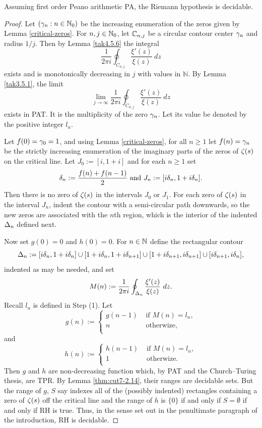 \documentclass[12pt]{article}
\begin{document}
\begin{theorem}\label{thm:RHdec}
Assuming first order Peano arithmetic PA, the Riemann hypothesis is decidable.
\end{theorem}
\begin{proof}

 Let $(\gamma_n:n\in\mathbb{N}_0)$ be the increasing enumeration of the zeros given by Lemma \ref{critical-zeros}. For $n,j\in\mathbb{N}_0$, let $\mathbb{C}_{n,j}$ be a circular contour center $\gamma_n$ and radius $1/j$. Then by Lemma \ref{tak4.5.6} the integral
$$
\frac{1}{2\pi i}\oint_{C_{n,j}} \frac{\xi'(z)}{\xi(z)}~dz
$$
exists and is monotonically decreasing in $j$ with values in $\mathbb{N}$. By Lemma \ref{tak3.5.1}, the limit
$$
\lim_{j\rightarrow \infty} \frac{1}{2\pi i}\oint_{C_{n,j}} \frac{\xi'(z)}{\xi(z)}~dz
$$
exists in PAT. It is the multiplicity of the zero $\gamma_n$. Let its value be denoted by the positive integer $l_n$.
\bigskip


 Let $f(0)=\gamma_0=1$, and using Lemma \ref{critical-zeros}, for all $n\ge 1$ let $f(n)=\gamma_n$ be the strictly increasing enumeration of the imaginary parts of the zeros of $\zeta(s)$ on the critical line. Let $J_0:= [i,1+i]$ and for each $n\ge 1$ set
$$
\delta_n:= \frac{f(n)+f(n-1)}{2}\text{ and } J_n:= [i\delta_n,1+i\delta_n].
$$
Then there is no zero of $\zeta(s)$ in the intervals $J_0$ or $J_1$.
For each zero of $\zeta(s)$ in the interval $J_n$, indent the contour with a semi-circular path downwards, so the new zeros are associated with the $n$th region, which is the interior of the indented $\Delta_n$ defined next.
\bigskip

 Now set $g(0)=0$ and $h(0)=0$. For $n\in\mathbb{N}$ define the rectangular contour
$$
\Delta_n:=[i\delta_n,1+i\delta_n]\cup [1+i\delta_n,1+i\delta_{n+1}]\cup [1+i\delta_{n+1},i\delta_{n+1}]\cup [i\delta_{n+1},i\delta_n],
$$
indented as may be needed, and set
$$
M(n):= \frac{1}{2\pi i}\oint_{\Delta_n} \frac{\xi'(z)}{\xi(z)}~dz.
$$
Recall $l_n$ is defined in Step (1). Let
$$
g(n):= \begin{cases}
g(n-1) & \text{ if } M(n)=l_n,\\
n &\text{ otherwize},\\
\end{cases}
$$
and
$$
h(n):= \begin{cases}
h(n-1) & \text{ if } M(n)=l_n,\\
1 &\text{ otherwize}.\\
\end{cases}
$$
Then $g$ and $h$ are non-decreasing function which, by PAT and the Church--Turing thesis, are TPR. By Lemma \ref{thm:cut7-2.14}, their ranges are decidable sets. But the range of $g$, $S$ say indexes all of the (possibly indented) rectangles containing a zero of $\zeta(s)$ off the critical line and the range of $h$ is $\{0\}$ if and only if $S=\emptyset$ if and only if RH is true. Thus, in the sense set out in the penultimate paragraph of the introduction, RH is decidable.\par
\end{proof}
\bigskip
\end{document}
